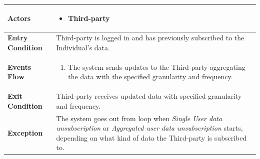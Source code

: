             \begin{table}[H]
            	\centering
                
                \begin{tabular}{|p{3cm}|p{8.2cm}|}
                    \hline
                    \textbf{Actors} &  \begin{itemize}
                                            \item Third-party
                                        \end{itemize}\\
                     \hline
                    \textbf{Entry Condition} & Third-party is logged in and has previously subscribed to the Individual's data.\\
                     \hline
                    \textbf{Events Flow} & \begin{enumerate}
                                                \item 
                                           The system sends updates to the Third-party aggregating the data with the specified granularity and frequency. \end{enumerate}\\
                     \hline
                    \textbf{Exit Condition} & Third-party receives updated data with specified granularity and frequency. \\
                     \hline
                    \textbf{Exception} & The system goes out from loop when \emph{Single User data unsubscription} or \emph{Aggregated user data unsubscription} starts, depending on what kind of data the Third-party is subscribed to. \\
                     \hline
                \end{tabular}  
            \end{table} 
            
